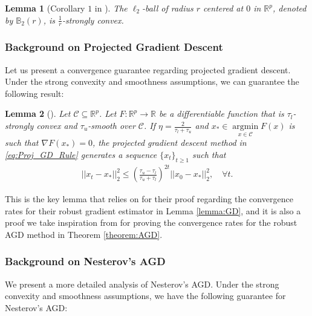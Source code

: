 \documentclass{article}
\newtheorem{lemma}{Lemma}
\begin{document}
\begin{lemma}[Corollary $1$ in \cite{ACCFW}]
\label{lemma:STR_CONV_BALL}
The $\ell_2$-ball of radius $r$ centered at $0$ in $\mathbb{R}^p$, denoted by $\mathbb{B}_2(r)$, is $\frac{1}{r}$-strongly convex.
\end{lemma}


\subsubsection{Background on Projected Gradient Descent}\label{sec:Appendix_GD}

Let us present a convergence guarantee regarding projected gradient descent. Under the strong convexity and smoothness assumptions, we can guarantee the following result:

\begin{lemma}[\cite{Nester}]
\label{lemma:Optimiz_Proj_GD_Conv}
Let $\mathcal{C} \subseteq \mathbb{R}^p$. Let $F : \mathbb{R}^p \rightarrow \mathbb{R}$ be a differentiable function that is $\tau_l$-strongly convex and $\tau_u$-smooth over $\mathcal{C}$. If $\eta = \frac{2}{\tau_l +  \tau_u}$ and $x_{*} \in \mathop{\arg\min}\limits_{x \in \mathcal{C}}F(x)$ is such that $\nabla F(x_{*}) = 0$, the projected gradient descent method in \eqref{eq:Proj_GD_Rule} generates a sequence $\{x_t\}_{t \geq 1}$ such that 
\begin{align*}
||x_t - x_{*}||_2^2 \leq \left(\frac{\tau_u - \tau_l}{\tau_u + \tau_l}\right)^{2t}||x_0 - x_{*}||_2^2, \quad \forall t.
\end{align*}
\end{lemma}

This is the key lemma that \cite{RE} relies on for their proof regarding the convergence rates for their robust gradient estimator in Lemma \ref{lemma:GD}, and it is also a proof we take inspiration from for proving the convergence rates for the robust AGD method in Theorem \ref{theorem:AGD}.

\subsubsection{Background on Nesterov's AGD}\label{sec:Appendix_AGD}

We present a more detailed analysis of Nesterov's AGD. Under the strong convexity and smoothness assumptions, we have the following guarantee for Nesterov's AGD:
\end{document}

